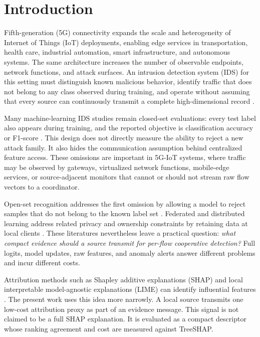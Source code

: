 \section{Introduction}

Fifth-generation (5G) connectivity expands the scale and heterogeneity of Internet of Things (IoT) deployments, enabling edge services in transportation, health care, industrial automation, smart infrastructure, and autonomous systems. The same architecture increases the number of observable endpoints, network functions, and attack surfaces. An intrusion detection system (IDS) for this setting must distinguish known malicious behavior, identify traffic that does not belong to any class observed during training, and operate without assuming that every source can continuously transmit a complete high-dimensional record \cite{sicari2015security,algaradi2020iot,liyanage2018guide,ferrag2023edge}.

Many machine-learning IDS studies remain closed-set evaluations: every test label also appears during training, and the reported objective is classification accuracy or F1-score \cite{ring2019survey,sommer2010outside}. This design does not directly measure the ability to reject a new attack family. It also hides the communication assumption behind centralized feature access. These omissions are important in 5G-IoT systems, where traffic may be observed by gateways, virtualized network functions, mobile-edge services, or source-adjacent monitors that cannot or should not stream raw flow vectors to a coordinator.

Open-set recognition addresses the first omission by allowing a model to reject samples that do not belong to the known label set \cite{scheirer2013open,bendale2016openmax,geng2021survey,hendrycks2017ood,liu2020energy}. Federated and distributed learning address related privacy and ownership constraints by retaining data at local clients \cite{mcmahan2017fedavg,kairouz2021fl,iotdefender2020,bellmunt2026ftl,man2021fedacnn}. These literatures nevertheless leave a practical question: \emph{what compact evidence should a source transmit for per-flow cooperative detection?} Full logits, model updates, raw features, and anomaly alerts answer different problems and incur different costs.

Attribution methods such as Shapley additive explanations (SHAP) and local interpretable model-agnostic explanations (LIME) can identify influential features \cite{lundberg2017shap,ribeiro2016lime,arrieta2020xai,samek2021xai}. The present work uses this idea more narrowly. A local source transmits one low-cost attribution proxy as part of an evidence message. This signal is not claimed to be a full SHAP explanation. It is evaluated as a compact descriptor whose ranking agreement and cost are measured against TreeSHAP.

